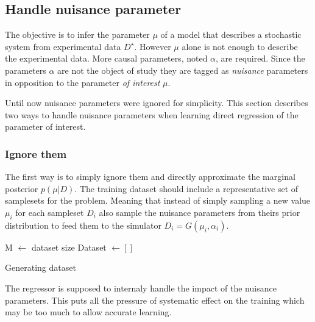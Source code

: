 \subsection{Handle nuisance parameter} %
\label{sub:handle_nuisance_parameter}

The objective is to infer the parameter $\mu$ of a model that describes a stochastic system from experimental data $D^\star$.
However $\mu$ alone is not enough to describe the experimental data.
More causal parameters, noted $\alpha$, are required.
Since the parameters $\alpha$ are not the object of study they are tagged as \emph{nuisance} parameters in opposition to the parameter \emph{of interest} $\mu$.

Until now nuisance parameters were ignored for simplicity.
This section describes two ways to handle nuisance parameters when learning direct regression of the parameter of interest.





\subsubsection{Ignore them} %
\label{subsub:ignore_them}


The first way is to simply ignore them and directly approximate the marginal posterior $p(\mu|D)$.
The training dataset should include a representative set of samplesets for the problem.
Meaning that instead of simply sampling a new value $\mu_i$ for each sampleset $D_i$ also sample the nuisance parameters from theirs prior distribution to feed them to the simulator $D_i = G(\mu_i, \alpha_i)$.

\begin{algorithm}[H]
 M $\gets$ dataset size \;
 Dataset $\gets []$ \;
 \caption{Generating dataset}
\end{algorithm}


The regressor is supposed to internaly handle the impact of the nuisance parameters.
This puts all the pressure of systematic effect on the training which may be too much to allow accurate learning.






